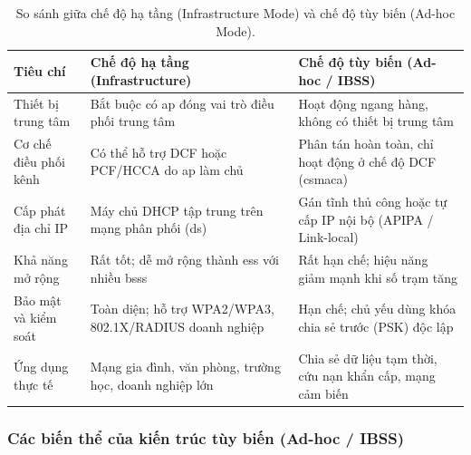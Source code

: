 \begin{table}[htbp]
  \centering\footnotesize
  \caption{So sánh giữa chế độ hạ tầng (Infrastructure Mode) và chế độ tùy biến (Ad-hoc Mode).}
  \label{tab:infra-vs-adhoc}
  \begin{tabularx}{\linewidth}{@{} L{0.65} L{1.15} L{1.2} @{}}
    \toprule
    \textbf{Tiêu chí} & \textbf{Chế độ hạ tầng (Infrastructure)} & \textbf{Chế độ tùy biến (Ad-hoc / IBSS)} \\
    \midrule
    Thiết bị trung tâm & Bắt buộc có \ac{ap} đóng vai trò điều phối trung tâm & Hoạt động ngang hàng, không có thiết bị trung tâm \\
    Cơ chế điều phối kênh & Có thể hỗ trợ DCF hoặc PCF/HCCA do \ac{ap} làm chủ & Phân tán hoàn toàn, chỉ hoạt động ở chế độ DCF (\ac{csmaca}) \\
    Cấp phát địa chỉ IP & Máy chủ DHCP tập trung trên mạng phân phối (\ac{ds}) & Gán tĩnh thủ công hoặc tự cấp IP nội bộ (APIPA / Link-local) \\
    Khả năng mở rộng & Rất tốt; dễ mở rộng thành \ac{ess} với nhiều \acp{bss} & Rất hạn chế; hiệu năng giảm mạnh khi số trạm tăng \\
    Bảo mật và kiểm soát & Toàn diện; hỗ trợ WPA2/WPA3, 802.1X/RADIUS doanh nghiệp & Hạn chế; chủ yếu dùng khóa chia sẻ trước (PSK) độc lập \\
    Ứng dụng thực tế & Mạng gia đình, văn phòng, trường học, doanh nghiệp lớn & Chia sẻ dữ liệu tạm thời, cứu nạn khẩn cấp, mạng cảm biến \\
    \bottomrule
  \end{tabularx}
\end{table}

\subsubsection{Các biến thể của kiến trúc tùy biến (Ad-hoc / IBSS)}

